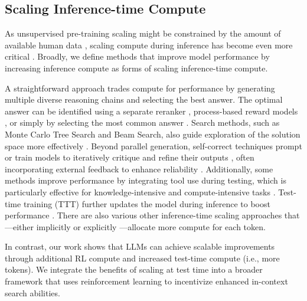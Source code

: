 \subsection{Scaling Inference-time Compute}

As unsupervised pre-training scaling might be constrained by the amount of available human data \citep{kaplan2020scaling, muennighoff2023scaling}, scaling compute during inference has become even more critical \citep{snell2025scaling}. Broadly, we define methods that improve model performance by increasing inference compute as forms of scaling inference-time compute.

A straightforward approach trades compute for performance by generating multiple diverse reasoning chains and selecting the best answer. The optimal answer can be identified using a separate reranker \citep{gsm8k, brown2024large}, process-based reward models \citep{uesato2022solving, lightman2023let}, or simply by selecting the most common answer \citep{wang2022self}.
Search methods, such as Monte Carlo Tree Search and Beam Search, also guide exploration of the solution space more effectively \citep{hao2023reasoning, feng2024alphazeroliketreesearchguidelarge, xin2024deepseekproverv15harnessingproofassistant, AlphaGeometryTrinh2024}.
Beyond parallel generation, self-correct techniques prompt or train models to iteratively critique and refine their outputs \citep{welleck2023generating, madaan2023selfrefine, kumar2024training}, often incorporating external feedback to enhance reliability \citep{yao2023react, gou2024critic}.
Additionally, some methods improve performance by integrating tool use during testing, which is particularly effective for knowledge-intensive \citep{nakano2021webgpt} and compute-intensive tasks \citep{schick2023toolformer, gou2024tora, chen2025empirical}.
Test-time training (TTT) further updates the model during inference to boost performance \citep{sun2020test, akyurek2024surprising}. There are also various other inference-time scaling approaches that—either implicitly \citep{geiping2025scaling} or explicitly \citep{zelikman2024quietstar}—allocate more compute for each token.

In contrast, our work shows that LLMs can achieve scalable improvements through additional RL compute and increased test-time compute (i.e., more tokens). We integrate the benefits of scaling at test time into a broader framework that uses reinforcement learning to incentivize enhanced in-context search abilities.


